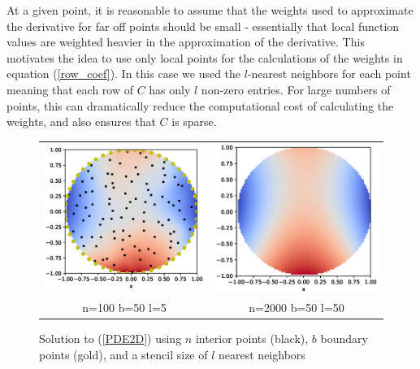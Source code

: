 \documentclass[12pt]{article}
\begin{document}
At a given point, it is reasonable to assume that the weights used to approximate the derivative for far off points should be small - essentially that local function values are weighted heavier in the approximation of the derivative. This motivates the idea to use only local points for the calculations of the weights in equation (\ref{row_coef}). In this case we used the $l$-nearest neighbors for each point meaning that each row of $C$ has only $l$ non-zero entries. For large numbers of points, this can dramatically reduce the computational cost of calculating the weights, and also ensures that $C$ is sparse. 

\begin{figure}[ht]
	\caption{Solution to (\ref{PDE2D}) using $n$ interior points (black), $b$ boundary points (gold), and a stencil size of $l$ nearest neighbors}
	\begin{tabular}{cc}
		\includegraphics[width=.5\textwidth]{2D_n100_b50} & \includegraphics[width=.5\textwidth]{2D_n2000_b50_l50} \\
		n=100 \phantom{==} b=50 \phantom{==} l=5 & n=2000 \phantom{==} b=50 \phantom{==} l=50 
	\end{tabular}
	\label{2Dsolutions}
	\centering
\end{figure}

\end{document}
